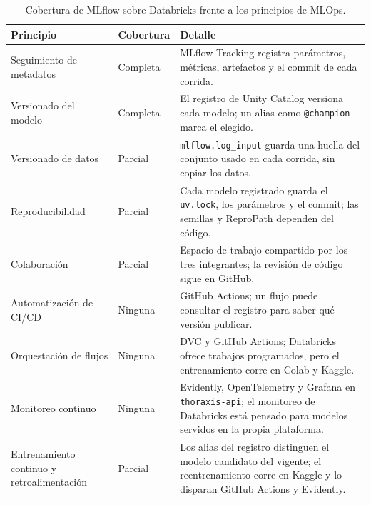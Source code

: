 \begin{table}[htbp]
    \centering
    \caption{Cobertura de MLflow sobre Databricks frente a los principios de
    MLOps.}\label{tab:mlflow-coverage}
    \small
    \begin{tabularx}{\textwidth}{>{\raggedright\arraybackslash}p{4.4cm}
                                 >{\raggedright\arraybackslash}p{1.7cm}
                                 >{\raggedright\arraybackslash}X}
        \toprule
        Principio & Cobertura & Detalle \\
        \midrule
        Seguimiento de metadatos & Completa & MLflow Tracking registra
            parámetros, métricas, artefactos y el commit de cada corrida. \\
        Versionado del modelo & Completa & El registro de Unity Catalog
            versiona cada modelo; un alias como \texttt{@champion} marca el
            elegido. \\
        Versionado de datos & Parcial & \texttt{mlflow.log\_input} guarda una
            huella del conjunto usado en cada corrida, sin copiar los datos. \\
        Reproducibilidad & Parcial & Cada modelo registrado guarda el
            \texttt{uv.lock}, los parámetros y el commit; las semillas y
            ReproPath dependen del código. \\
        Colaboración & Parcial & Espacio de trabajo compartido por los tres
            integrantes; la revisión de código sigue en GitHub. \\
        Automatización de CI/CD & Ninguna & GitHub Actions; un flujo puede
            consultar el registro para saber qué versión publicar. \\
        Orquestación de flujos & Ninguna & DVC y GitHub Actions; Databricks
            ofrece trabajos programados, pero el entrenamiento corre en Colab y
            Kaggle. \\
        Monitoreo continuo & Ninguna & Evidently, OpenTelemetry y Grafana en
            \texttt{thoraxis-api}; el monitoreo de Databricks está pensado para
            modelos servidos en la propia plataforma. \\
        Entrenamiento continuo y retroalimentación & Parcial & Los alias del
            registro distinguen el modelo candidato del vigente; el
            reentrenamiento corre en Kaggle y lo disparan GitHub Actions y
            Evidently. \\
        \bottomrule
    \end{tabularx}
\end{table}

